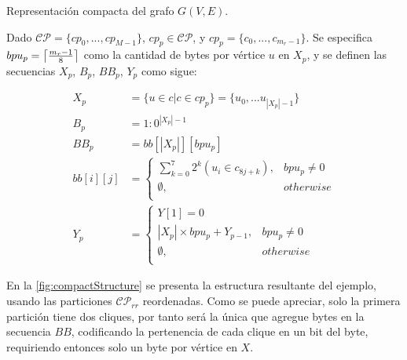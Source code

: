 \begin{definition} 
	\label{def:sequences}
	Representación compacta del grafo $G(V, E)$. 
	
	Dado $\mathcal{C}\mathcal{P} = \{cp_{0},...,cp_{M-1}\}$, $cp_{p} \in \mathcal{C}\mathcal{P}$, y $cp_{p}=\{c_{0},...,c_{m_{r}-1}\}$. 
	Se especifica $bpu_{p} = \ceil*{\frac{m_{r}-1}{8}}$ como la cantidad de bytes por vértice $u$ en $X_{p}$, y se definen las secuencias $X_{p}$, $B_{p}$, $BB_{p}$, $Y_{p}$ como sigue:
	
	\begin{align}
		X_{p} &= \{u \in c|c \in cp_{p}\} = \{u_{0},...u_{|X_{p}|-1}\} \\
		B_{p} &= 1:0^{|X_{p}|-1} \\
		BB_{p} &= bb[|X_{p}|][bpu_{p}]   \label{eq:bbp} \\
		bb[i][j] &= \begin{cases}
                  \sum_{k=0}^{7} 2^{k}(u_{i} \in c_{8j+k}), & bpu_{p} \neq 0  \\
                  \emptyset, & otherwise \\
                 \end{cases} \nonumber \\
		Y_{p} &= \begin{cases}
				Y[1] = 0 \\
				|X_{p}|\times bpu_{p} + Y_{p-1}, & bpu_{p} \neq 0  \\
				 \emptyset, & otherwise \\
			\end{cases}
	\end{align}
\end{definition}


En la \autoref{fig:compactStructure} se presenta la estructura resultante del ejemplo, usando las particiones $\mathcal{C}\mathcal{P}_{rr}$ reordenadas. Como se puede apreciar, solo la primera partición tiene dos cliques, por tanto será la única que agregue bytes en la secuencia $BB$, codificando la pertenencia de cada clique en un bit del byte, requiriendo entonces solo un byte por vértice en $X$.

